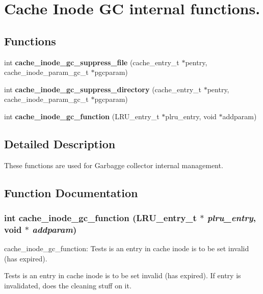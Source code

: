 \section{Cache Inode GC internal functions.}
\label{group__Cache__inode__gc__internal}
\subsection*{Functions}
\begin{CompactItemize}
\item 
int {\bf cache\_\-inode\_\-gc\_\-suppress\_\-file} (cache\_\-entry\_\-t $\ast$pentry, cache\_\-inode\_\-param\_\-gc\_\-t $\ast$pgcparam)
\item 
int {\bf cache\_\-inode\_\-gc\_\-suppress\_\-directory} (cache\_\-entry\_\-t $\ast$pentry, cache\_\-inode\_\-param\_\-gc\_\-t $\ast$pgcparam)
\item 
int {\bf cache\_\-inode\_\-gc\_\-function} (LRU\_\-entry\_\-t $\ast$plru\_\-entry, void $\ast$addparam)
\end{CompactItemize}


\subsection{Detailed Description}
These functions are used for Garbagge collector internal management. 

\subsection{Function Documentation}
\subsubsection{\setlength{\rightskip}{0pt plus 5cm}int cache\_\-inode\_\-gc\_\-function (LRU\_\-entry\_\-t $\ast$ {\em plru\_\-entry}, void $\ast$ {\em addparam})}\label{group__Cache__inode__gc__internal_ga4}


cache\_\-inode\_\-gc\_\-function: Tests is an entry in cache inode is to be set invalid (has expired).

Tests is an entry in cache inode is to be set invalid (has expired). If entry is invalidated, does the cleaning stuff on it.

